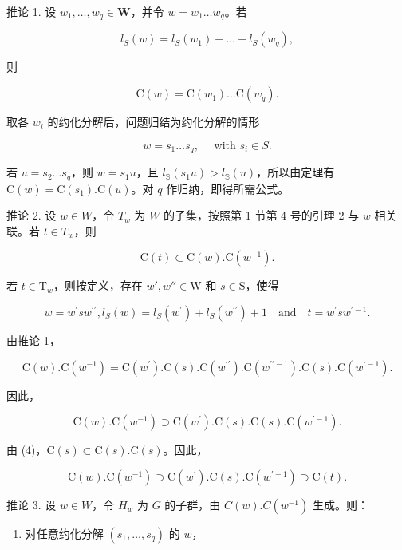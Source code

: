 推论 1. 设 \(w_{1}, \ldots, w_{q} \in \mathbf{W}\)，并令 \(w = w_{1} \ldots w_{q}\)。若

\[
l _ {S} (w) = l _ {S} \left(w _ {1}\right) + \dots + l _ {S} \left(w _ {q}\right),
\]

则

\[
\mathrm{C} (w) = \mathrm{C} (w _ {1}) \dots \mathrm{C} (w _ {q}).
\]

取各 \(w_{i}\) 的约化分解后，问题归结为约化分解的情形

\[
w = s _ {1} \dots s _ {q}, \quad \text { with } s _ {i} \in S.
\]

若 \(u = s_2 \ldots s_q\)，则 \(w = s_1u\)，且 \(l_{\mathbb{S}}(s_1u) > l_{\mathbb{S}}(u)\)，所以由定理有 \(\mathrm{C}(w) = \mathrm{C}(s_1). \mathrm{C}(u)\)。对 \(q\) 作归纳，即得所需公式。

推论 2. 设 \(w \in W\)，令 \(T_w\) 为 \(W\) 的子集，按照第 1 节第 4 号的引理 2 与 \(w\) 相关联。若 \(t \in T_w\)，则

\[
\mathrm{C} (t) \subset \mathrm{C} (w). \mathrm{C} (w ^ {- 1}).
\]

若 \(t \in \mathrm{T}_w\)，则按定义，存在 \(w', w'' \in \mathrm{W}\) 和 \(s \in \mathrm{S}\)，使得

\[
w = w ^ {\prime} s w ^ {\prime \prime}, l _ {S} (w) = l _ {S} (w ^ {\prime}) + l _ {S} (w ^ {\prime \prime}) + 1 \quad \text {and} \quad t = w ^ {\prime} s w ^ {\prime - 1}.
\]

由推论 1，

\[
\mathrm{C} (w). \mathrm{C} (w ^ {- 1}) = \mathrm{C} (w ^ {\prime}). \mathrm{C} (s). \mathrm{C} (w ^ {\prime \prime}). \mathrm{C} (w ^ {\prime \prime - 1}). \mathrm{C} (s). \mathrm{C} (w ^ {\prime - 1}).
\]

因此，

\[
\mathrm{C} (w). \mathrm{C} (w ^ {- 1}) \supset \mathrm{C} (w ^ {\prime}). \mathrm{C} (s). \mathrm{C} (s). \mathrm{C} (w ^ {\prime - 1}).
\]

由 (4)，\(\mathrm{C}(s) \subset \mathrm{C}(s). \mathrm{C}(s)\)。因此，

\[
\mathrm{C} (w). \mathrm{C} (w ^ {- 1}) \supset \mathrm{C} (w ^ {\prime}). \mathrm{C} (s). \mathrm{C} (w ^ {\prime - 1}) \supset \mathrm{C} (t).
\]

推论 3. 设 \(w \in W\)，令 \(H_w\) 为 \(G\) 的子群，由 \(C(w).C(w^{-1})\) 生成。则：

\begin{enumerate}
\def\labelenumi{\alph{enumi})}
\tightlist
\item
  对任意约化分解 \((s_1,\ldots ,s_q)\) 的 \(w\)，
\end{enumerate}

